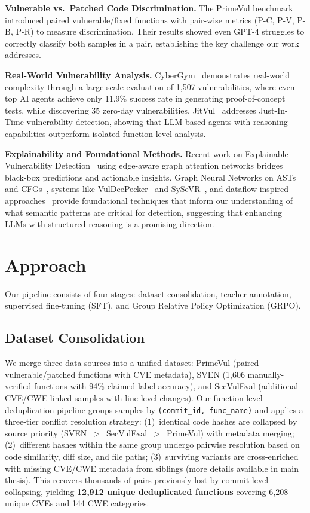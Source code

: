 \documentclass{article}
\begin{document}
\textbf{Vulnerable vs.\ Patched Code Discrimination.} The PrimeVul benchmark~\cite{primevul} introduced paired vulnerable/fixed functions with pair-wise metrics (P-C, P-V, P-B, P-R) to measure discrimination. Their results showed even GPT-4 struggles to correctly classify both samples in a pair, establishing the key challenge our work addresses.

\textbf{Real-World Vulnerability Analysis.} CyberGym~\cite{cybergym} demonstrates real-world complexity through a large-scale evaluation of 1,507 vulnerabilities, where even top AI agents achieve only 11.9\% success rate in generating proof-of-concept tests, while discovering 35 zero-day vulnerabilities. JitVul~\cite{jitvul} addresses Just-In-Time vulnerability detection, showing that LLM-based agents with reasoning capabilities outperform isolated function-level analysis.

\textbf{Explainability and Foundational Methods.} Recent work on Explainable Vulnerability Detection~\cite{explainable_vuln} using edge-aware graph attention networks bridges black-box predictions and actionable insights. Graph Neural Networks on ASTs and CFGs~\cite{devign}, systems like VulDeePecker~\cite{VulDeePecker_paper} and SySeVR~\cite{SySeVR_paper}, and dataflow-inspired approaches~\cite{deepdfa} provide foundational techniques that inform our understanding of what semantic patterns are critical for detection, suggesting that enhancing LLMs with structured reasoning is a promising direction.

\section{Approach}

Our pipeline consists of four stages: dataset consolidation, teacher annotation, supervised fine-tuning (SFT), and Group Relative Policy Optimization (GRPO).

\subsection{Dataset Consolidation}

We merge three data sources into a unified dataset: PrimeVul (paired vulnerable/patched functions with CVE metadata), SVEN (1,606 manually-verified functions with 94\% claimed label accuracy), and SecVulEval (additional CVE/CWE-linked samples with line-level changes). Our function-level deduplication pipeline groups samples by \texttt{(commit\_id, func\_name)} and applies a three-tier conflict resolution strategy: (1)~identical code hashes are collapsed by source priority (SVEN~$>$~SecVulEval~$>$~PrimeVul) with metadata merging; (2)~different hashes within the same group undergo pairwise resolution based on code similarity, diff size, and file paths; (3)~surviving variants are cross-enriched with missing CVE/CWE metadata from siblings (more details available in main thesis). This recovers thousands of pairs previously lost by commit-level collapsing, yielding \textbf{12,912 unique deduplicated functions} covering 6,208 unique CVEs and 144 CWE categories.
\end{document}
